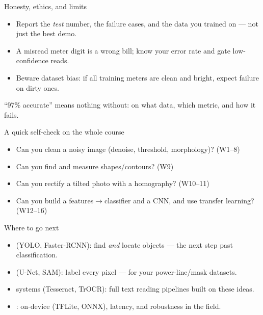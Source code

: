 \documentclass[10pt,aspectratio=169]{beamer}
\begin{document}
\begin{frame}{Honesty, ethics, and limits}
  \begin{itemize}
    \item Report the \emph{test} number, the failure cases, and the data you trained on — not just the best demo.
    \item A misread meter digit is a wrong bill; know your error rate and gate low-confidence reads.
    \item Beware dataset bias: if all training meters are clean and bright, expect failure on dirty ones.
  \end{itemize}
  \begin{badbox}
    ``97\% accurate'' means nothing without: on what data, which metric, and how it fails.
  \end{badbox}
\end{frame}

\begin{frame}{A quick self-check on the whole course}
  \begin{itemize}
    \item Can you clean a noisy image (denoise, threshold, morphology)? (W1--8)
    \item Can you find and measure shapes/contours? (W9)
    \item Can you rectify a tilted photo with a homography? (W10--11)
    \item Can you build a features$\rightarrow$classifier and a CNN, and use transfer learning? (W12--16)
  \end{itemize}
\end{frame}

\begin{frame}{Where to go next}
  \begin{itemize}
    \item {} (YOLO, Faster-RCNN): find \emph{and} locate objects — the next step past classification.
    \item {} (U-Net, SAM): label every pixel — for your power-line/mask datasets.
    \item {} systems (Tesseract, TrOCR): full text reading pipelines built on these ideas.
    \item {}: on-device (TFLite, ONNX), latency, and robustness in the field.
  \end{itemize}
\end{frame}
\end{document}
